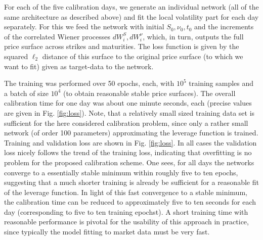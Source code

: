 \documentclass[
a4paper,     %
12pt           %
]{scrartcl}  %
\numberwithin{equation}{section}
\begin{document}
For each of the five calibration days, we generate an individual network (all of the same architecture as described above) and fit the local volatility part for each day separately. For this we feed the network with initial $S_0,\nu_0,t_0$ and the increments of the correlated Wiener processes $dW_i^S, dW_i^\nu$, which, in turn, outputs the full price surface across strikes and maturities. The loss function is given by the squared $\ell_2$ distance of this surface to the original price surface (to which we want to fit) given as target-data to the network.

The training was performed over 50 epochs, each, with $10^5$ training samples and a batch of size $10^4$ (to obtain reasonable stable price surfaces). The overall calibration time for one day was about one minute seconds, each (precise values are given in Fig. \ref{fig:loss}). Note, that a relatively small sized training data set is sufficient for the here considered calibration problem, since only a rather small network (of order 100 parameters) approximating the leverage function is trained. Training and validation loss are shown in Fig. \ref{fig:loss}. In all cases the validation loss nicely follows the trend of the training loss, indicating that overfitting is no problem for the proposed calibration scheme. One sees, for all days the networks converge to a essentially stable minimum within roughly five to ten epochs, suggesting that a much shorter training is already be sufficient for a reasonable fit of the leverage function. In light of this fast convergence to a stable minimum, the calibration time can be reduced to approximately five to ten seconds for each day (corresponding to five to ten training epochst). A short training time with reasonable performance is pivotal for the usability of this approach in practice, since typically the model fitting to market data must be very fast.
\end{document}
